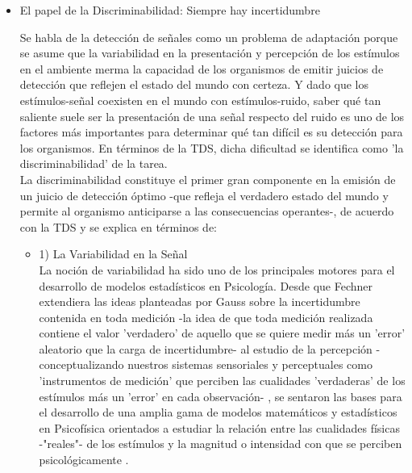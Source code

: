\begin{itemize}
  \item{El papel de la Discriminabilidad: Siempre hay incertidumbre}

Se habla de la detección de señales como un problema de adaptación porque se asume que la variabilidad en la presentación y percepción de los estímulos en el ambiente merma la capacidad de los organismos de emitir juicios de detección que reflejen el estado del mundo con certeza. Y dado que los estímulos-señal coexisten en el mundo con estímulos-ruido, saber qué tan saliente suele ser la presentación de una señal respecto del ruido es uno de los factores más importantes para determinar qué tan difícil es su detección para los organismos. En términos de la TDS, dicha dificultad se identifica como 'la discriminabilidad' de la tarea.\\

La discriminabilidad constituye el primer gran componente en la emisión de un juicio de detección óptimo -que refleja el verdadero estado del mundo y permite al organismo anticiparse a las consecuencias operantes-, de acuerdo con la TDS y se explica en términos de:\\ %

    \begin{itemize}
      \item{1) La Variabilidad en la Señal}\\

La noción de variabilidad ha sido uno de los principales motores para el desarrollo de modelos estadísticos en Psicología. Desde que Fechner extendiera las ideas planteadas por Gauss sobre la incertidumbre contenida en toda medición -la idea de que toda medición realizada contiene el valor 'verdadero' de aquello que se quiere medir más un 'error' aleatorio que la carga de incertidumbre- al estudio de la percepción -conceptualizando nuestros sistemas sensoriales y perceptuales como 'instrumentos de medición' que perciben las cualidades 'verdaderas' de los estímulos más un 'error' en cada observación- \parencite{Fechner, Gauss}, se sentaron las bases para el desarrollo de una amplia gama de modelos matemáticos y estadísticos en Psicofísica orientados a estudiar la relación entre las cualidades físicas -"reales"- de los estímulos y la magnitud o intensidad con que se perciben psicológicamente \parencite{Link1994}.\\


\end{itemize}
\end{itemize}
